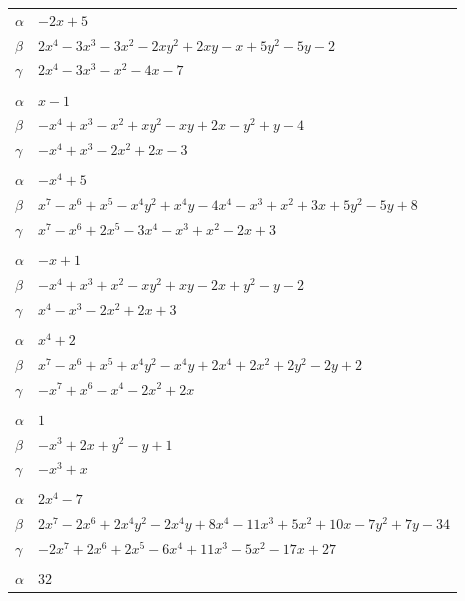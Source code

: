 \documentclass[11pt]{article}
\begin{document}
\begin{longtable}{@{}ll@{}}
$\alpha$ & $-2x+5$\\
$\beta$ & $2x^{4}-3x^{3}-3x^{2}-2xy^{2}+2xy-x+5y^{2}-5y-2$\\
$\gamma$ & $2x^{4}-3x^{3}-x^{2}-4x-7$\\
\addlinespace[3pt]
\multicolumn{2}{@{}l}{$\{i,j\}=\{2,19\}$, $k_{ij}=3$}\\
$\alpha$ & $x-1$\\
$\beta$ & $-x^{4}+x^{3}-x^{2}+xy^{2}-xy+2x-y^{2}+y-4$\\
$\gamma$ & $-x^{4}+x^{3}-2x^{2}+2x-3$\\
\addlinespace[3pt]
\multicolumn{2}{@{}l}{$\{i,j\}=\{2,21\}$, $k_{ij}=2^{2}\cdot 3$}\\
$\alpha$ & $-x^{4}+5$\\
$\beta$ & $x^{7}-x^{6}+x^{5}-x^{4}y^{2}+x^{4}y-4x^{4}-x^{3}+x^{2}+3x+5y^{2}-5y+8$\\
$\gamma$ & $x^{7}-x^{6}+2x^{5}-3x^{4}-x^{3}+x^{2}-2x+3$\\
\addlinespace[3pt]
\multicolumn{2}{@{}l}{$\{i,j\}=\{2,24\}$, $k_{ij}=3^{2}$}\\
$\alpha$ & $-x+1$\\
$\beta$ & $-x^{4}+x^{3}+x^{2}-xy^{2}+xy-2x+y^{2}-y-2$\\
$\gamma$ & $x^{4}-x^{3}-2x^{2}+2x+3$\\
\addlinespace[3pt]
\multicolumn{2}{@{}l}{$\{i,j\}=\{2,25\}$, $k_{ij}=2\cdot 3$}\\
$\alpha$ & $x^{4}+2$\\
$\beta$ & $x^{7}-x^{6}+x^{5}+x^{4}y^{2}-x^{4}y+2x^{4}+2x^{2}+2y^{2}-2y+2$\\
$\gamma$ & $-x^{7}+x^{6}-x^{4}-2x^{2}+2x$\\
\addlinespace[3pt]
\multicolumn{2}{@{}l}{$\{i,j\}=\{2,28\}$, $k_{ij}=3$}\\
$\alpha$ & $1$\\
$\beta$ & $-x^{3}+2x+y^{2}-y+1$\\
$\gamma$ & $-x^{3}+x$\\
\addlinespace[3pt]
\multicolumn{2}{@{}l}{$\{i,j\}=\{2,34\}$, $k_{ij}=3\cdot 11$}\\
$\alpha$ & $2x^{4}-7$\\
$\beta$ & $2x^{7}-2x^{6}+2x^{4}y^{2}-2x^{4}y+8x^{4}-11x^{3}+5x^{2}+10x-7y^{2}+7y-34$\\
$\gamma$ & $-2x^{7}+2x^{6}+2x^{5}-6x^{4}+11x^{3}-5x^{2}-17x+27$\\
\addlinespace[3pt]
\multicolumn{2}{@{}l}{$\{i,j\}=\{3,5\}$, $k_{ij}=11\cdot 13$}\\
$\alpha$ & $32$\\

\end{longtable}
\end{document}
